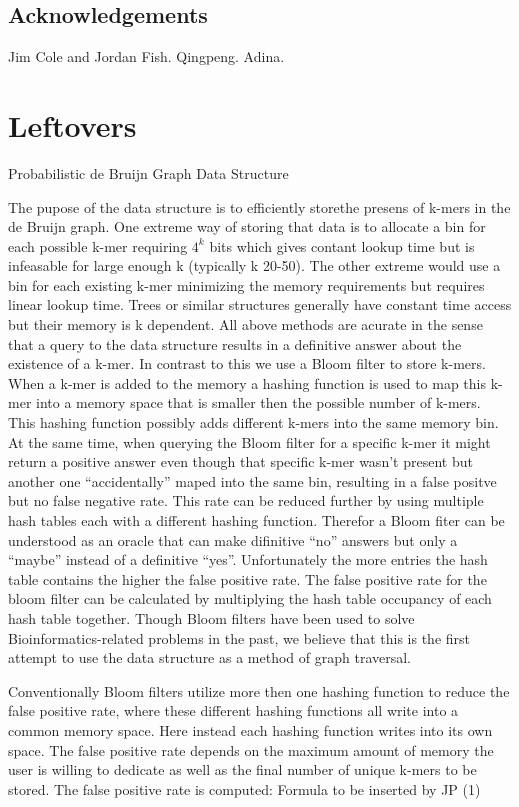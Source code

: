 \documentclass[12pt]{article} \usepackage{simplemargins}
\begin{document}
\subsection{Acknowledgements}

Jim Cole and Jordan Fish.  Qingpeng.  Adina.

\section{Leftovers}

Probabilistic de Bruijn Graph Data Structure

The pupose of the data structure is to efficiently storethe presens of
k-mers in the de Bruijn graph. One extreme way of storing that data is
to allocate a bin for each possible k-mer requiring $4^k$ bits which
gives contant lookup time but is infeasable for large enough k
(typically k 20-50). The other extreme would use a bin for each
existing k-mer minimizing the memory requirements but requires linear
lookup time. Trees or similar structures generally have constant time
access but their memory is k dependent. All above methods are acurate
in the sense that a query to the data structure results in a
definitive answer about the existence of a k-mer.  In contrast to this
we use a Bloom filter to store k-mers. When a k-mer is added to the
memory a hashing function is used to map this k-mer into a memory
space that is smaller then the possible number of k-mers. This hashing
function possibly adds different k-mers into the same memory bin. At
the same time, when querying the Bloom filter for a specific k-mer it
might return a positive answer even though that specific k-mer wasn’t
present but another one “accidentally” maped into the same bin,
resulting in a false positve but no false negative rate. This rate can
be reduced further by using multiple hash tables each with a different
hashing function. Therefor a Bloom fiter can be understood as an
oracle that can make difinitive “no” answers but only a “maybe”
instead of a definitive “yes”. Unfortunately the more entries the hash
table contains the higher the false positive rate. The false positive
rate for the bloom filter can be calculated by multiplying the hash
table occupancy of each hash table together. Though Bloom
filters have been used to solve Bioinformatics-related problems in the
past\cite{pmid20426693, pmid20472541, haskell}, 
we believe that this is the first attempt to use the data
structure as a method of graph traversal.

Conventionally Bloom filters utilize more then one hashing function to
reduce the false positive rate, where these different hashing
functions all write into a common memory space. Here instead each
hashing function writes into its own space. The false positive rate
depends on the maximum amount of memory the user is willing to
dedicate as well as the final number of unique k-mers to be
stored. The false positive rate is computed:  Formula to be inserted by JP (1)
\end{document}
